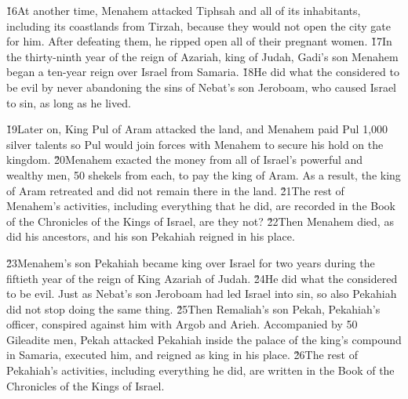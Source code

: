 \v{16}At another time, Menahem attacked Tiphsah and all of its inhabitants, including its coastlands from Tirzah, because they would not open the city gate for him. After defeating them, he ripped open all of their pregnant women. \v{17}In the thirty-ninth year of the reign of Azariah, king of Judah, Gadi's son Menahem began a ten-year reign over Israel from Samaria. \v{18}He did what the  considered to be evil by never abandoning the sins of Nebat's son Jeroboam, who caused Israel to sin, as long as he lived.

\v{19}Later on, King Pul of Aram attacked the land, and Menahem paid Pul 1,000 silver talents so Pul would join forces with Menahem to secure his hold on the kingdom. \v{20}Menahem exacted the money from all of Israel's powerful and wealthy men, 50 shekels from each, to pay the king of Aram. As a result, the king of Aram retreated and did not remain there in the land. \v{21}The rest of Menahem's activities, including everything that he did, are recorded in the Book of the Chronicles of the Kings of Israel, are they not? \v{22}Then Menahem died, as did his ancestors, and his son Pekahiah reigned in his place.

\v{23}Menahem's son Pekahiah became king over Israel for two years during the fiftieth year of the reign of King Azariah of Judah. \v{24}He did what the  considered to be evil. Just as Nebat's son Jeroboam had led Israel into sin, so also Pekahiah did not stop doing the same thing. \v{25}Then Remaliah's son Pekah, Pekahiah's officer, conspired against him with Argob and Arieh. Accompanied by 50 Gileadite men, Pekah attacked Pekahiah inside the palace of the king's compound in Samaria, executed him, and reigned as king in his place. \v{26}The rest of Pekahiah's activities, including everything he did, are written in the Book of the Chronicles of the Kings of Israel.

